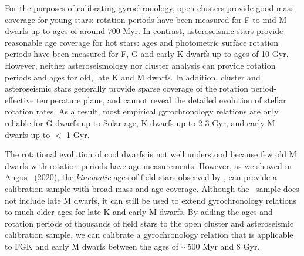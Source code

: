 For the purposes of calibrating gyrochronology, open clusters provide good
mass coverage for young stars: rotation periods have been measured for F to
mid M dwarfs up to ages of around 700 Myr.
In contrast, asteroseismic stars provide reasonable age coverage for hot
stars: ages and photometric surface rotation periods have been measured for F,
G and early K dwarfs up to ages of 10 Gyr.
However, neither asteroseismology nor cluster analysis can provide rotation
periods and ages for old, late K and M dwarfs.
In addition, cluster and asteroseismic stars generally provide sparse coverage
of the rotation period-effective temperature plane, and cannot reveal the
detailed evolution of stellar rotation rates.
As a result, most empirical gyrochronology relations are only reliable for G
dwarfs up to Solar age, K dwarfs up to 2-3 Gyr, and early M dwarfs up to $<$ 1
Gyr.

The rotational evolution of cool dwarfs is not well understood because few old
M dwarfs with rotation periods have age measurements.
However, as we showed in Angus \etal\ (2020), the {\it kinematic} ages of
field stars observed by \kepler, can provide a calibration sample with broad
mass and age coverage.
Although the \kepler\ sample does not include late M dwarfs, it can still be
used to extend gyrochronology relations to much older ages for late K and
early M dwarfs.
By adding the ages and rotation periods of thousands of field stars to the
open cluster and asteroseismic calibration sample, we can calibrate a
gyrochronology relation that is applicable to FGK and early M dwarfs between
the ages of $\sim$500 Myr and 8 Gyr.


